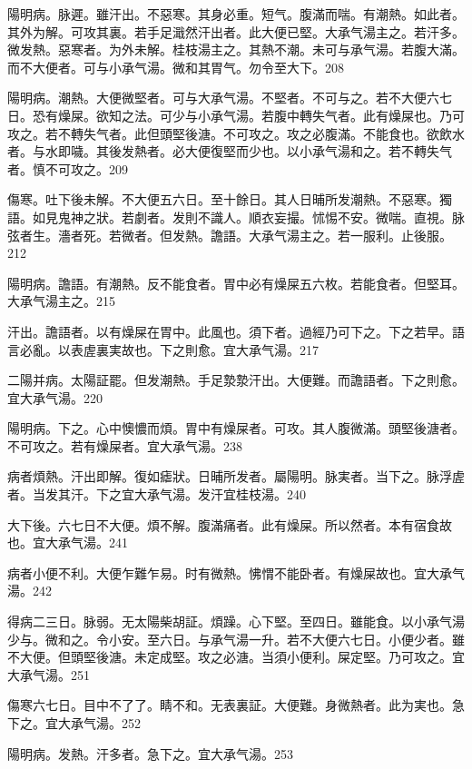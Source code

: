 陽明病。脉遲。雖汗出。不惡寒。其身必重。短气。腹滿而喘。有潮熱。如此者。其外为解。可攻其裏。若手足濈然汗出者。此大便已堅。{\khaaitp 大}承气湯主之。若汗多。微发熱。惡寒者。为外未解。{\khaaitp 桂枝湯主之。}其熱不潮。未可与承气湯。若腹大滿。而不大便者。可与小承气湯。微和其胃气。勿令至大下。208

陽明病。潮熱。大便微堅者。可与{\khaaitp 大}承气湯。不堅者。不可与之。若不大便六七日。恐有燥屎。欲知之法。可少与小承气湯。若腹中轉失气者。此有燥屎也。乃可攻之。若不轉失气者。此但頭堅後溏。不可攻之。攻之必腹滿。不能食也。欲飲水者。与水即噦。其後发熱者。必大便復堅而少也。以小承气湯和之。若不轉失气者。慎不可攻之。209

傷寒。吐下後未解。不大便五六日。至十餘日。其人日晡所发潮熱。不惡寒。獨語。如見鬼{\khaaitp 神之}狀。若劇者。发則不識人。順衣妄撮。怵惕不安。微喘。直視。脉弦者生。濇者死。{\khaaitp 若}微者。但发熱。譫語。{\khaaitp 大}承气湯主之。若一服利。止後服。212

陽明病。譫語。有潮熱。反不能食者。{\khaaitp 胃中}必有燥屎五六枚。若能食者。但堅耳。{\khaaitp 大}承气湯主之。215

汗出。譫語者。以有燥屎在胃中。此風也。{\khaaitp 須下者。}過經乃可下之。下之若早。語言必亂。以表虗裏実故也。下之則愈。宜{\khaaitp 大}承气湯。217

二陽并病。太陽証罷。但发潮熱。手足漐漐汗出。大便難。而譫語者。下之則愈。宜{\khaaitp 大}承气湯。220

陽明病。下之。心中懊憹而煩。胃中有燥屎者。可攻。其人腹微滿。頭堅後溏者。不可攻之。若有燥屎者。宜{\khaaitp 大}承气湯。238

病者煩熱。汗出即解。復如瘧狀。日晡所发者。屬陽明。脉実者。当下之。脉浮虗者。当发其汗。下之宜{\khaaitp 大}承气湯。发汗宜桂枝湯。240

大下後。六七日不大便。煩不解。腹滿痛者。此有燥屎。所以然者。本有宿食故也。宜{\khaaitp 大}承气湯。241

病者小便不利。大便乍難乍易。时有微熱。怫㥜不能卧者。有燥屎故也。宜{\khaaitp 大}承气湯。242

得病二三日。脉弱。无太陽柴胡証。煩躁。心下堅。至四日。雖能食。以{\khaaitp 小}承气湯少与。微和之。令小安。至六日。与承气湯一升。若不大便六七日。小便少者。雖不大便。但頭堅後溏。未定成堅。攻之必溏。当須小便利。屎定堅。乃可攻之。宜{\khaaitp 大}承气湯。251

傷寒六七日。目中不了了。睛不和。无表{\khaaitp 裏}証。大便難。身微熱者。此为実也。急下之。宜{\khaaitp 大}承气湯。252

陽明病。发熱。汗多者。急下之。宜{\khaaitp 大}承气湯。253

